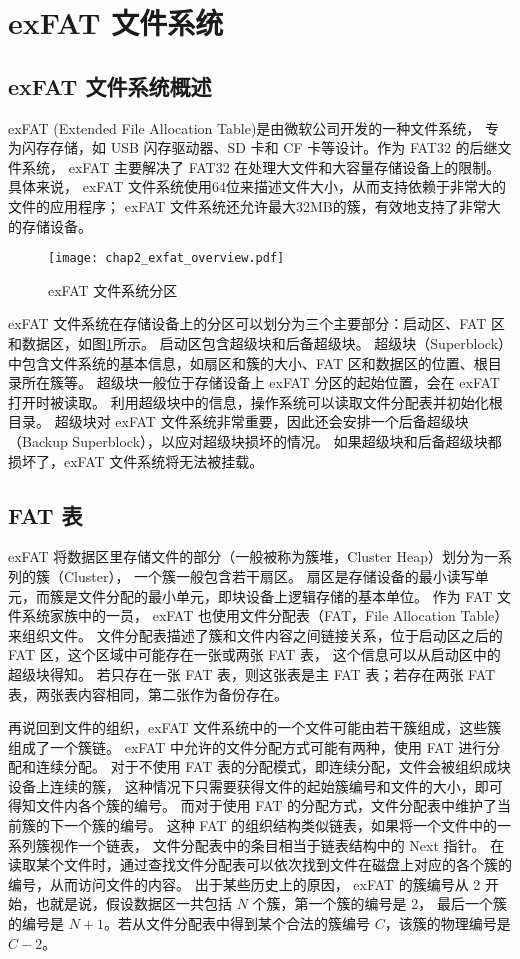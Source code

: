 \section{exFAT 文件系统}
\subsection{exFAT 文件系统概述}
exFAT (Extended File Allocation Table)\parencite{exFAT,exFAT1,exFAT2}是由微软公司开发的一种文件系统，
专为闪存存储，如 USB 闪存驱动器、SD 卡和 CF 卡等设计。作为 FAT32\parencite{russinovich2009windows} 的后继文件系统，
exFAT 主要解决了 FAT32 在处理大文件和大容量存储设备上的限制。具体来说，
exFAT 文件系统使用64位来描述文件大小，从而支持依赖于非常大的文件的应用程序；
exFAT 文件系统还允许最大32MB的簇，有效地支持了非常大的存储设备。

\begin{figure}[h]
    \centering
    \texttt{[image: chap2\_exfat\_overview.pdf]}
    \caption{exFAT 文件系统分区}
    \label{fig:exfat_overview}
\end{figure}

exFAT 文件系统在存储设备上的分区可以划分为三个主要部分：启动区、FAT 区和数据区，如图\ref{fig:exfat_overview}所示。
启动区包含超级块和后备超级块。
超级块（Superblock）中包含文件系统的基本信息，如扇区和簇的大小、FAT 区和数据区的位置、根目录所在簇等。
超级块一般位于存储设备上 exFAT 分区的起始位置，会在 exFAT 打开时被读取。
利用超级块中的信息，操作系统可以读取文件分配表并初始化根目录。
超级块对 exFAT 文件系统非常重要，因此还会安排一个后备超级块（Backup Superblock），以应对超级块损坏的情况。
如果超级块和后备超级块都损坏了，exFAT 文件系统将无法被挂载。

\subsection{FAT 表}\label{subsec:fat}
exFAT 将数据区里存储文件的部分（一般被称为簇堆，Cluster Heap）划分为一系列的簇（Cluster），
一个簇一般包含若干扇区。
扇区是存储设备的最小读写单元，而簇是文件分配的最小单元，即块设备上逻辑存储的基本单位。
作为 FAT 文件系统家族中的一员， exFAT 也使用文件分配表（FAT，File Allocation Table）\parencite{anderson2016fat}来组织文件。
文件分配表描述了簇和文件内容之间链接关系，位于启动区之后的 FAT 区，这个区域中可能存在一张或两张 FAT 表，
这个信息可以从启动区中的超级块得知。
若只存在一张 FAT 表，则这张表是主 FAT 表；若存在两张 FAT 表，两张表内容相同，第二张作为备份存在。

再说回到文件的组织，exFAT 文件系统中的一个文件可能由若干簇组成，这些簇组成了一个簇链。
exFAT 中允许的文件分配方式可能有两种，使用 FAT 进行分配和连续分配。
对于不使用 FAT 表的分配模式，即连续分配，文件会被组织成块设备上连续的簇，
这种情况下只需要获得文件的起始簇编号和文件的大小，即可得知文件内各个簇的编号。
而对于使用 FAT 的分配方式，文件分配表中维护了当前簇的下一个簇的编号。
这种 FAT 的组织结构类似链表，如果将一个文件中的一系列簇视作一个链表，
文件分配表中的条目相当于链表结构中的 Next 指针。
在读取某个文件时，通过查找文件分配表可以依次找到文件在磁盘上对应的各个簇的编号，从而访问文件的内容。
出于某些历史上的原因， exFAT 的簇编号从 2 开始，也就是说，假设数据区一共包括 $ N $ 个簇，第一个簇的编号是 2，
最后一个簇的编号是 $ N + 1 $。若从文件分配表中得到某个合法的簇编号 $ C $，该簇的物理编号是 $ C - 2 $。

